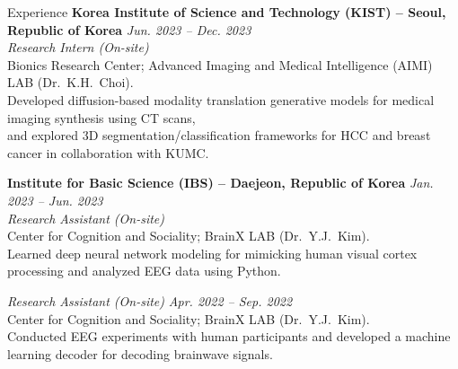 \documentclass{resume}
\begin{document}
\begin{rSection}{Experience}
\bigskip
\textbf{Korea Institute of Science and Technology (KIST) -- Seoul, Republic of Korea} \hfill \textit{Jun. 2023 -- Dec. 2023} \\
\hspace*{0.5em} \textit{Research Intern (On-site)} \\
\hspace*{1em} Bionics Research Center; Advanced Imaging and Medical Intelligence (AIMI) LAB (Dr.\ K.H.\ Choi). \\
\hspace*{1em} Developed diffusion-based modality translation generative models for medical imaging synthesis using CT scans, \\
\hspace*{1em} and explored 3D segmentation/classification frameworks for HCC and breast cancer in collaboration with KUMC.

\bigskip
\textbf{Institute for Basic Science (IBS) -- Daejeon, Republic of Korea} \hfill \textit{Jan. 2023 -- Jun. 2023} \\
\hspace*{0.5em} \textit{Research Assistant (On-site)} \\
\hspace*{1em} Center for Cognition and Sociality; BrainX LAB (Dr.\ Y.J.\ Kim). \\
\hspace*{1em} Learned deep neural network modeling for mimicking human visual cortex processing and analyzed EEG data using Python. \vspace{3pt}

\hspace*{0.5em} \textit{Research Assistant (On-site)} \hfill \textit{Apr. 2022 -- Sep. 2022} \\
\hspace*{1em} Center for Cognition and Sociality; BrainX LAB (Dr.\ Y.J.\ Kim). \\
\hspace*{1em} Conducted EEG experiments with human participants and developed a machine learning decoder for decoding brainwave signals.

\end{rSection}
\end{document}
